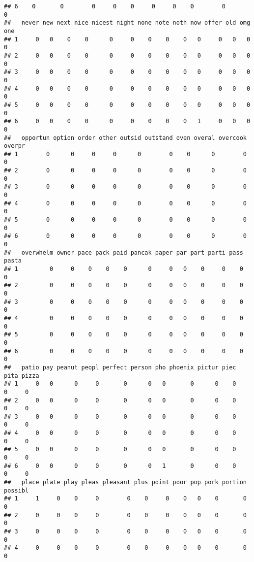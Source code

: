 \documentclass[]{article}
\begin{document}
\begin{verbatim}
## 6    0       0        0     0    0     0     0    0        0            0
##   never new next nice nicest night none note noth now offer old omg one
## 1     0   0    0    0      0     0    0    0    0   0     0   0   0   0
## 2     0   0    0    0      0     0    0    0    0   0     0   0   0   0
## 3     0   0    0    0      0     0    0    0    0   0     0   0   0   0
## 4     0   0    0    0      0     0    0    0    0   0     0   0   0   0
## 5     0   0    0    0      0     0    0    0    0   0     0   0   0   0
## 6     0   0    0    0      0     0    0    0    0   1     0   0   0   0
##   opportun option order other outsid outstand oven overal overcook overpr
## 1        0      0     0     0      0        0    0      0        0      0
## 2        0      0     0     0      0        0    0      0        0      0
## 3        0      0     0     0      0        0    0      0        0      0
## 4        0      0     0     0      0        0    0      0        0      0
## 5        0      0     0     0      0        0    0      0        0      0
## 6        0      0     0     0      0        0    0      0        0      0
##   overwhelm owner pace pack paid pancak paper par part parti pass pasta
## 1         0     0    0    0    0      0     0   0    0     0    0     0
## 2         0     0    0    0    0      0     0   0    0     0    0     0
## 3         0     0    0    0    0      0     0   0    0     0    0     0
## 4         0     0    0    0    0      0     0   0    0     0    0     0
## 5         0     0    0    0    0      0     0   0    0     0    0     0
## 6         0     0    0    0    0      0     0   0    0     0    0     0
##   patio pay peanut peopl perfect person pho phoenix pictur piec pita pizza
## 1     0   0      0     0       0      0   0       0      0    0    0     0
## 2     0   0      0     0       0      0   0       0      0    0    0     0
## 3     0   0      0     0       0      0   0       0      0    0    0     0
## 4     0   0      0     0       0      0   0       0      0    0    0     0
## 5     0   0      0     0       0      0   0       0      0    0    0     0
## 6     0   0      0     0       0      0   1       0      0    0    0     0
##   place plate play pleas pleasant plus point poor pop pork portion possibl
## 1     1     0    0     0        0    0     0    0   0    0       0       0
## 2     0     0    0     0        0    0     0    0   0    0       0       0
## 3     0     0    0     0        0    0     0    0   0    0       0       0
## 4     0     0    0     0        0    0     0    0   0    0       0       0

\end{verbatim}
\end{document}
